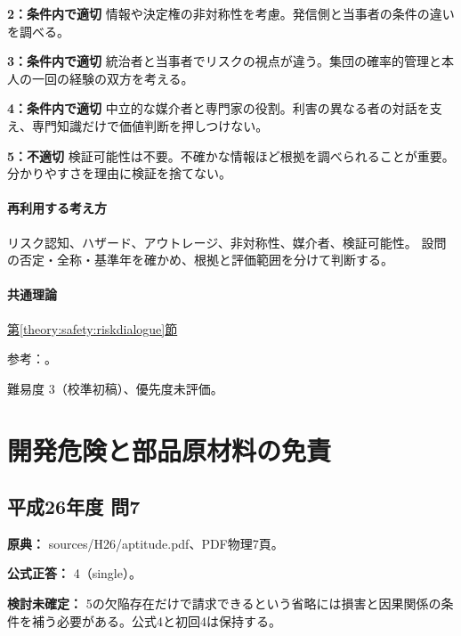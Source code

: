 \noindent\textbf{2：条件内で適切} 情報や決定権の非対称性を考慮。発信側と当事者の条件の違いを調べる。\par

\noindent\textbf{3：条件内で適切} 統治者と当事者でリスクの視点が違う。集団の確率的管理と本人の一回の経験の双方を考える。\par

\noindent\textbf{4：条件内で適切} 中立的な媒介者と専門家の役割。利害の異なる者の対話を支え、専門知識だけで価値判断を押しつけない。\par

\noindent\textbf{5：不適切} 検証可能性は不要。不確かな情報ほど根拠を調べられることが重要。分かりやすさを理由に検証を捨てない。\par

\paragraph{再利用する考え方} リスク認知、ハザード、アウトレージ、非対称性、媒介者、検証可能性。 設問の否定・全称・基準年を確かめ、根拠と評価範囲を分けて判断する。

\paragraph{共通理論} \hyperref[theory:safety:riskdialogue]{第\ref*{theory:safety:riskdialogue}節}

\par 参考：\cite{eth54_riskcomm}。

\par 難易度 3（校準初稿）、優先度未評価。

\section{開発危険と部品原材料の免責}

\subsection{平成26年度 問7}
\label{q:h26-reg-apt-07}

\noindent\textbf{原典：} sources/H26/aptitude.pdf、PDF物理7頁。

\textbf{公式正答：} 4（single）。

\par\textbf{検討未確定：} 5の欠陥存在だけで請求できるという省略には損害と因果関係の条件を補う必要がある。公式4と初回4は保持する。


